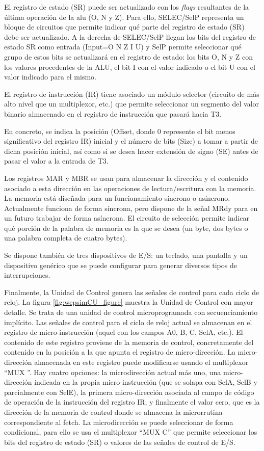El registro de estado (SR) puede ser actualizado con los \emph{flags} resultantes de la última operación de la alu (O, N y Z). Para ello, SELEC/SelP representa un bloque de circuitos que permite indicar qué parte del registro de estado (SR) debe ser actualizado. A la derecha de SELEC/SelP llegan los bits del registro de estado SR como entrada (Input=O N Z I U) y SelP permite seleccionar qué grupo de estos bits se actualizará en el registro de estado: los bits O, N y Z con los valores procedentes de la ALU, el bit I con el valor indicado o el bit U con el valor indicado para el mismo.

El registro de instrucción (IR) tiene asociado un módulo selector (circuito de  más alto nivel que un multiplexor, etc.) que permite seleccionar un segmento del valor binario almacenado en el registro de instrucción que pasará hacia T3.

En concreto, se indica la posición (Offset, donde 0 represente el bit menos significativo del registro IR) inicial y el número de bits (Size) a tomar a partir de dicha posición inicial, así como si se desea hacer extensión de signo (SE) antes de pasar el valor a la entrada de T3.

Los registros MAR y MBR se usan para almacenar la dirección y el contenido asociado a esta dirección en las operaciones de lectura/escritura con la memoria. La memoria está diseñada para un funcionamiento síncrono o asíncrono. Actualmente funciona de forma síncrona, pero dispone de la señal MRdy para en un futuro trabajar de forma asíncrona. El circuito de selección permite indicar qué porción de la palabra de memoria es la que se desea (un byte, dos bytes o una palabra completa de cuatro bytes).

Se dispone también de tres dispositivos de E/S: un teclado, una pantalla y un dispositivo genérico que se puede configurar para generar diversos tipos de interrupciones.

Finalmente, la Unidad de Control genera las señales de control para cada ciclo de reloj. La figura \ref{fig:wepsimCU_figure} muestra la Unidad de Control con mayor detalle. Se trata de una unidad de control microprogramada con secuenciamiento implícito. Las señales de control para el ciclo de reloj actual se almacenan en el registro de micro-instrucción (aquel con los campos A0, B, C, SelA, etc.). El contenido de este registro proviene de la memoria de control, concretamente del contenido en la posición a la que apunta el registro de micro-dirección. La micro-dirección almacenada en este registro puede modificarse usando el multiplexor ``MUX ''. Hay cuatro opciones: la microdirección actual más uno, una micro-dirección indicada en la propia micro-instrucción (que se solapa con SelA, SelB y parcialmente con SelE), la primera micro-dirección asociada al campo de código de operación de la instrucción del registro IR, y finalmente el valor cero, que es la dirección de la memoria de control donde se almacena la microrrutina correspondiente al fetch. La microdirección se puede seleccionar de forma condicional, para ello se usa el multiplexor ``MUX C'' que permite seleccionar los bits del registro de estado (SR) o valores de las señales de control de E/S.

